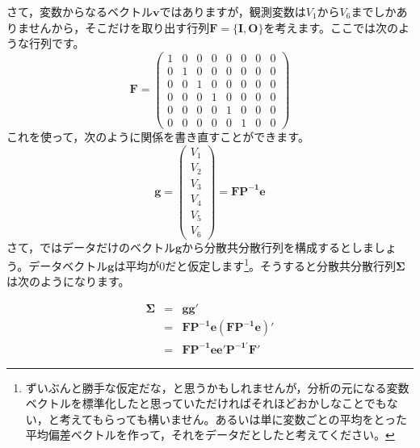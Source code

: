 \documentclass{ltjsbook}
\begin{document}
さて，変数からなるベクトル$\bm{v}$ではありますが，観測変数は$V_1$から$V_6$までしかありませんから，そこだけを取り出す行列$\bm{F}=\{ \bm{I},\bm{O} \}$を考えます。ここでは次のような行列です。
\[
	\bm{F} =
	\begin{pmatrix} 1 & 0 & 0 & 0 & 0 & 0 & 0 & 0 \\
                0 & 1 & 0 & 0 & 0 & 0 & 0 & 0 \\
                0 & 0 & 1 & 0 & 0 & 0 & 0 & 0 \\
                0 & 0 & 0 & 1 & 0 & 0 & 0 & 0 \\
                0 & 0 & 0 & 0 & 1 & 0 & 0 & 0 \\
                0 & 0 & 0 & 0 & 0 & 1 & 0 & 0\end{pmatrix}
\]
これを使って，次のように関係を書き直すことができます。
\[
	\bm{g} = \begin{pmatrix}  V_1 \\ V_2 \\ V_3 \\ V_4 \\ V_5 \\ V_6 \end{pmatrix} = \bm{FP^{-1}e}
\]
さて，ではデータだけのベクトル$\bm{g}$から分散共分散行列を構成するとしましょう。データベクトル$\bm{g}$は平均が0だと仮定します\footnote{ずいぶんと勝手な仮定だな，と思うかもしれませんが，分析の元になる変数ベクトルを標準化したと思っていただければそれほどおかしなことでもない，と考えてもらっても構いません。あるいは単に変数ごとの平均をとった平均偏差ベクトルを作って，それをデータだとしたと考えてください。}。そうすると分散共分散行列$\bm{\Sigma}$は次のようになります。

\begin{eqnarray*}
	\bm{\Sigma} &=& \bm{gg'}  \\
	& = & \bm{ F P^{-1} e ( F P^{-1} e) '} \\
	& = & \bm{ FP^{-1} ee' P^{-1'} F' }
\end{eqnarray*}
\end{document}
